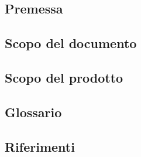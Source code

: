 \subsection{Premessa}\label{sec:Premessa}


\subsection{Scopo del documento}\label{sec:Scopo-del-documento}


\subsection{Scopo del prodotto}\label{sec:Scopo-del-prodotto}


\subsection{Glossario}\label{sec:Glossario}


\subsection{Riferimenti}\label{sec:Riferimenti}
